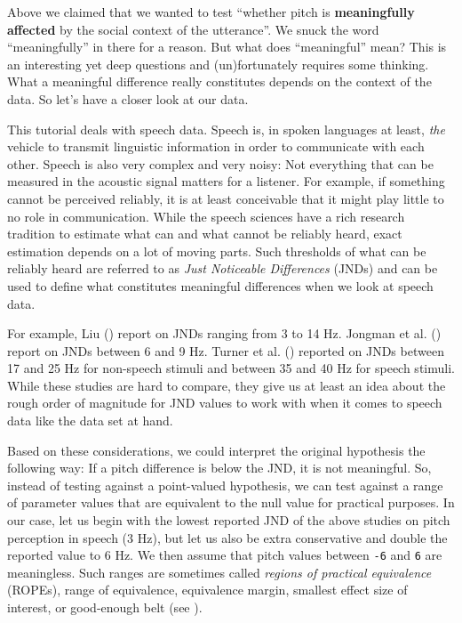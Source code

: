 \documentclass[
  doc,
  floatsintext,
  longtable,
  nolmodern,
  notxfonts,
  notimes,
  colorlinks=true,linkcolor=blue,citecolor=blue,urlcolor=blue]{apa7}
\begin{document}
Above we claimed that we wanted to test ``whether pitch is
\textbf{meaningfully affected} by the social context of the utterance''.
We snuck the word ``meaningfully'' in there for a reason. But what does
``meaningful'' mean? This is an interesting yet deep questions and
(un)fortunately requires some thinking. What a meaningful difference
really constitutes depends on the context of the data. So let's have a
closer look at our data.

This tutorial deals with speech data. Speech is, in spoken languages at
least, \emph{the} vehicle to transmit linguistic information in order to
communicate with each other. Speech is also very complex and very noisy:
Not everything that can be measured in the acoustic signal matters for a
listener. For example, if something cannot be perceived reliably, it is
at least conceivable that it might play little to no role in
communication. While the speech sciences have a rich research tradition
to estimate what can and what cannot be reliably heard, exact estimation
depends on a lot of moving parts. Such thresholds of what can be
reliably heard are referred to as \emph{Just Noticeable Differences}
(JNDs) and can be used to define what constitutes meaningful differences
when we look at speech data.

For example, Liu () report on JNDs
ranging from 3 to 14 Hz. Jongman et al.
() report on JNDs between 6 and 9
Hz. Turner et al. () reported
on JNDs between 17 and 25 Hz for non-speech stimuli and between 35 and
40 Hz for speech stimuli. While these studies are hard to compare, they
give us at least an idea about the rough order of magnitude for JND
values to work with when it comes to speech data like the data set at
hand.

Based on these considerations, we could interpret the original
hypothesis the following way: If a pitch difference is below the JND, it
is not meaningful. So, instead of testing against a point-valued
hypothesis, we can test against a range of parameter values that are
equivalent to the null value for practical purposes. In our case, let us
begin with the lowest reported JND of the above studies on pitch
perception in speech (3 Hz), but let us also be extra conservative and
double the reported value to 6 Hz. We then assume that pitch values
between \texttt{-6} and \texttt{6} are meaningless. Such ranges are
sometimes called \emph{regions of practical equivalence} (ROPEs), range
of equivalence, equivalence margin, smallest effect size of interest, or
good-enough belt (see
).
\end{document}
